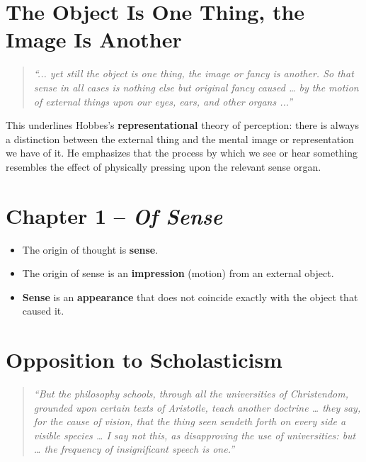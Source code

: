 \section*{The Object Is One Thing, the Image Is Another}

\begin{quote}
\textit{“... yet still the object is one thing, the image or fancy is another. So that sense in all cases is nothing else but original fancy caused … by the motion of external things upon our eyes, ears, and other organs ...”}
\end{quote}

This underlines Hobbes’s \textbf{representational} theory of perception: there is always a distinction between the external thing and the mental image or representation we have of it. He emphasizes that the process by which we see or hear something resembles the effect of physically pressing upon the relevant sense organ.

\section*{Chapter 1 -- \textit{Of Sense}}

\begin{remark}
\begin{itemize}
  \item The origin of thought is \textbf{sense}.
  \item The origin of sense is an \textbf{impression} (motion) from an external object.
  \item \textbf{Sense} is an \textbf{appearance} that does not coincide exactly with the object that caused it.
\end{itemize}
\end{remark}

\section*{Opposition to Scholasticism}

\begin{quote}
\textit{“But the philosophy schools, through all the universities of Christendom, grounded upon certain texts of Aristotle, teach another doctrine … they say, for the cause of vision, that the thing seen sendeth forth on every side a visible species … I say not this, as disapproving the use of universities: but … the frequency of insignificant speech is one.”}
\end{quote}

